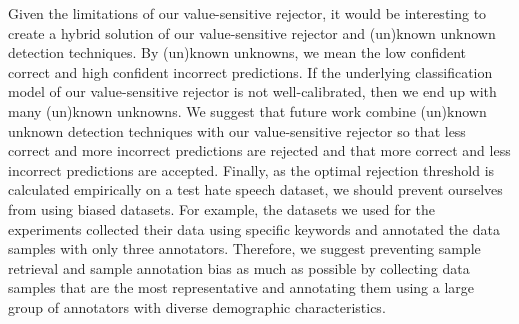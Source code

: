 %
Given the limitations of our value-sensitive rejector, it would be interesting to create a hybrid solution of our value-sensitive rejector and (un)known unknown detection techniques.
%
By (un)known unknowns, we mean the low confident correct and high confident incorrect predictions.
%
If the underlying classification model of our value-sensitive rejector is not well-calibrated, then we end up with many (un)known unknowns.
%
We suggest that future work combine (un)known unknown detection techniques with our value-sensitive rejector so that less correct and more incorrect predictions are rejected and that more correct and less incorrect predictions are accepted.
%
Finally, as the optimal rejection threshold is calculated empirically on a test hate speech dataset, we should prevent ourselves from using biased datasets.
%
For example, the datasets we used for the experiments collected their data using specific keywords and annotated the data samples with only three annotators.
%
Therefore, we suggest preventing sample retrieval and sample annotation bias as much as possible by collecting data samples that are the most representative and annotating them using a large group of annotators with diverse demographic characteristics.